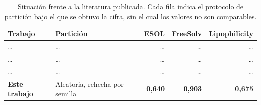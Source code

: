 %
%
\begin{table}[htbp]
  \centering
  \caption{Situación frente a la literatura publicada. Cada fila indica el
           protocolo de partición bajo el que se obtuvo la cifra, sin el cual
           los valores no son comparables.}
  \label{tab:b3-literatura}
  \small
  \begin{tabularx}{\textwidth}{@{}Xlrrr@{}}
    \toprule
    Trabajo & Partición & ESOL & FreeSolv & Lipophilicity \\
    \midrule
    \dots\ \cite{}          & \dots & \dots & \dots & \dots \\
    \dots\ \cite{}          & \dots & \dots & \dots & \dots \\
    \dots\ \cite{}          & \dots & \dots & \dots & \dots \\
    \midrule
    \textbf{Este trabajo}   & Aleatoria, rehecha por semilla & \textbf{0,640} & \textbf{0,903} & \textbf{0,675} \\
    \bottomrule
  \end{tabularx}
\end{table}

